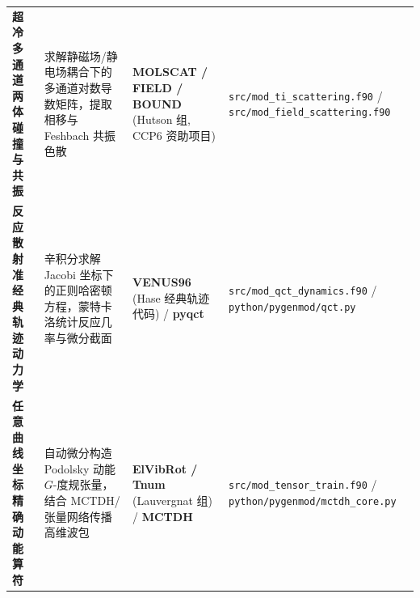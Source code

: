 \documentclass[
]{ctexbook}
\begin{document}
\begin{longtable}[]{@{}llll@{}}
\begin{minipage}[t]{0.22\columnwidth}
\textbf{超冷多通道两体碰撞与共振}\strut
\end{minipage} & \begin{minipage}[t]{0.22\columnwidth}\raggedright
求解静磁场/静电场耦合下的多通道对数导数矩阵，提取相移与 Feshbach
共振色散\strut
\end{minipage} & \begin{minipage}[t]{0.22\columnwidth}\raggedright
\textbf{MOLSCAT / FIELD / BOUND} (Hutson 组, CCP6 资助项目)\strut
\end{minipage} & \begin{minipage}[t]{0.22\columnwidth}\raggedright
\texttt{src/mod\_ti\_scattering.f90} /
\texttt{src/mod\_field\_scattering.f90}\strut
\end{minipage}\tabularnewline
\begin{minipage}[t]{0.22\columnwidth}\raggedright
\textbf{反应散射准经典轨迹动力学}\strut
\end{minipage} & \begin{minipage}[t]{0.22\columnwidth}\raggedright
辛积分求解 Jacobi
坐标下的正则哈密顿方程，蒙特卡洛统计反应几率与微分截面\strut
\end{minipage} & \begin{minipage}[t]{0.22\columnwidth}\raggedright
\textbf{VENUS96} (Hase 经典轨迹代码) / \textbf{pyqct}\strut
\end{minipage} & \begin{minipage}[t]{0.22\columnwidth}\raggedright
\texttt{src/mod\_qct\_dynamics.f90} /
\texttt{python/pygenmod/qct.py}\strut
\end{minipage}\tabularnewline
\begin{minipage}[t]{0.22\columnwidth}\raggedright
\textbf{任意曲线坐标精确动能算符}\strut
\end{minipage} & \begin{minipage}[t]{0.22\columnwidth}\raggedright
自动微分构造 Podolsky 动能 \(G\)-度规张量，结合
MCTDH/张量网络传播高维波包\strut
\end{minipage} & \begin{minipage}[t]{0.22\columnwidth}\raggedright
\textbf{ElVibRot / Tnum} (Lauvergnat 组) / \textbf{MCTDH}\strut
\end{minipage} & \begin{minipage}[t]{0.22\columnwidth}\raggedright
\texttt{src/mod\_tensor\_train.f90} /
\texttt{python/pygenmod/mctdh\_core.py}\strut
\end{minipage}\tabularnewline
\bottomrule
\end{longtable}
\end{document}
